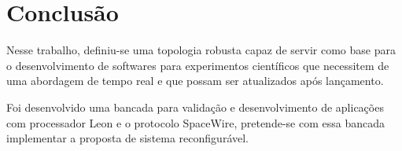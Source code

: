 \documentclass[journal,a4paper,oneside,twocolumn]{IEEEtran}
\begin{document}
\section{Conclusão}	
		
		Nesse trabalho, definiu-se uma topologia robusta capaz de servir como base para o desenvolvimento de softwares para experimentos científicos que necessitem de uma abordagem de tempo real e que possam ser atualizados após lançamento. 
		
		Foi desenvolvido uma bancada para validação e desenvolvimento de aplicações com processador Leon e o protocolo SpaceWire, pretende-se com essa bancada  implementar a proposta de sistema reconfigurável.
	




%
%
\end{document}
